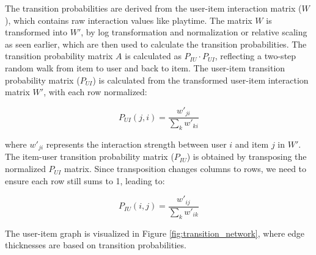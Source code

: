 \documentclass[conference,compsoc]{IEEEtran}
\begin{document}
The transition probabilities are derived from the user-item interaction matrix (\(W\)), which contains raw interaction values like playtime. The matrix \(W\) is transformed into \(W'\), by log transformation and normalization or relative scaling as seen earlier, which are then used to calculate the transition probabilities.  The transition probability matrix \(A\) is calculated as \(P_{IU} \cdot P_{UI}\), reflecting a two-step random walk from item to user and back to item. The user-item transition probability matrix (\(P_{UI}\)) is calculated from the transformed user-item interaction matrix \(W'\), with each row normalized:

\begin{equation}
    P_{UI}(j, i) = \frac{w'_{ji}}{\sum_{k}w'_{ki}}
\end{equation}

where $w'_{ji}$ represents the interaction strength between user $i$ and item $j$ in $W'$. The item-user transition probability matrix ($P_{IU}$) is obtained by transposing the normalized $P_{UI}$ matrix. Since transposition changes columns to rows, we need to ensure each row still sums to 1, leading to:

\begin{equation}
    P_{IU}(i, j) = \frac{w'_{ij}}{\sum_{k}w'_{ik}}
\end{equation}

The user-item graph is visualized in Figure \ref{fig:transition_network}, where edge thicknesses are based on transition probabilities.
\end{document}
